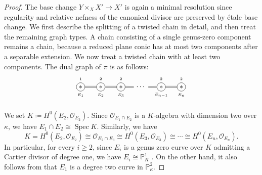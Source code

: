 \documentclass[12pt]{amsart}
\def\ge{\geqslant}
\def\Spec{\operatorname{Spec}}
\newcommand{\PP}{\mathbb{P}}
\newcommand{\sO}{\mathcal{O}}
\theoremstyle{plain}
\theoremstyle{definition}
\theoremstyle{remark}
\newtheorem{defn and notation}[thm]{Definition and Notation}
\theoremstyle{plain}
\numberwithin{equation}{thm}
\begin{document}
\begin{proof}
    The base change $Y\times_X X'\to X'$ is again a minimal resolution since regularity and relative nefness of the canonical divisor are preserved by \'etale base change.
    We first describe the splitting of a twisted chain in detail, and then treat the remaining graph types.
    A chain consisting of a single genus-zero component remains a chain, because a reduced plane conic has at most two components after a separable extension. We now treat a twisted chain with at least two components.
    The dual graph of $\pi$ is as follows:
\[
\begin{tikzpicture}
\node[draw, shape=circle, inner sep=1.8pt] (E1) at (1,0){$*$};
\node[draw, shape=circle, inner sep=1.8pt] (E2) at (2,0){$*$};
\node[draw, shape=circle, inner sep=1.8pt] (E3) at (3,0){$*$};
\draw node (dot) at (4,0){$\cdots$};
\node[draw, shape=circle, inner sep=1.8pt] (E_{n-1}) at (5,0){$*$};
\node[draw, shape=circle, inner sep=1.8pt] (E_n) at (6,0){$*$};

\draw[shift={(0,0.4)}] (1,0) node{\tiny $1$};
\draw[shift={(0,0.4)}] (2,0) node{\tiny $2$};
\draw[shift={(0,0.4)}] (3,0) node{\tiny $2$};
\draw[shift={(0,0.4)}] (4,0) node{\tiny ${}$};
\draw[shift={(0,0.4)}] (5,0) node{\tiny $2$};
\draw[shift={(0,0.4)}] (6,0) node{\tiny $2$};

\draw[shift={(0,-0.4)}] (1,0) node{\tiny $E_1$};
\draw[shift={(0,-0.4)}] (2,0) node{\tiny $E_2$};
\draw[shift={(0,-0.4)}] (3,0) node{\tiny $E_3$};
\draw[shift={(0,-0.4)}] (4,0) node{\tiny ${}$};
\draw[shift={(0,-0.4)}] (5,0) node{\tiny $E_{n-1}$};
\draw[shift={(0,-0.4)}] (6,0) node{\tiny $E_n$};


\draw (E1.-10)--(E2.-170);
\draw (E1.10)--(E2.170);
\draw (E2.-10)--(E3.-170);
\draw (E2.10)--(E3.170);
\draw (E3.-10)--(dot.-175);
\draw (E3.10)--(dot.175);
\draw (dot.-5)--(E_{n-1}.-175);
\draw (dot.5)--(E_{n-1}.170);
\draw (E_{n-1}.-10)--(E_n.-170);
\draw (E_{n-1}.10)--(E_n.170);

\end{tikzpicture}
        \]

We set $K \coloneqq H^0(E_2,\sO_{E_2})$.
Since $\sO_{E_1 \cap E_2}$ is a $K$-algebra with dimension two over $\kappa$, we have $E_1 \cap E_2 \cong \Spec K$.
Similarly, we have 
\[
K=H^0(E_2,\sO_{E_2}) \cong \sO_{E_2 \cap E_3} \cong H^0(E_3,\sO_{E_3}) \cong \cdots \cong H^0(E_n,\sO_{E_n}).
\]
In particular, for every $i \ge 2$, since $E_i$ is a genus zero curve over $K$ admitting a Cartier divisor of degree one, we have $E_i \cong \PP^1_K$ \cite[Lemma 10.6]{Kol13}.
On the other hand, it also follows from \cite[Lemma 10.6]{Kol13} that $E_1$ is a degree two curve in $\PP^2_\kappa$.


\end{proof}
\end{document}
